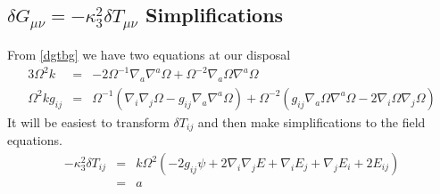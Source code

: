 \documentclass[10pt,letterpaper]{article}
\numberwithin{equation}{section}
\begin{document}
\subsection{$\delta G_{\mu\nu} = -\kappa^2_3 \delta T_{\mu\nu}$ Simplifications}
From \eqref{dgtbg} we have two equations at our disposal
\begin{eqnarray}
 3\Omega^2k &=& -2\Omega^{-1}\nabla_a\nabla^a \Omega + \Omega^{-2} \nabla_a\Omega \nabla^a\Omega
\nonumber\\
\Omega^2 kg_{ij} &=& \Omega^{-1}\left(  \nabla_i\nabla_j \Omega - g_{ij}\nabla_a\nabla^a\Omega\right)  + \Omega^{-2} \left( g_{ij} \nabla_a\Omega\nabla^a\Omega -2 \nabla_i \Omega\nabla_j\Omega\right) 
\end{eqnarray}
It will be easiest to transform $\delta T_{ij}$ and then make simplifications to the field equations.
\begin{eqnarray}
-\kappa^2_3\delta T_{ij}&=& k \Omega^2 (-2 g_{ij}\psi + 2\nabla_i\nabla_j E + \nabla_i E_j + \nabla_j E_i + 2E_{ij})
\nonumber\\
&=& a
\end{eqnarray}

\end{document}
